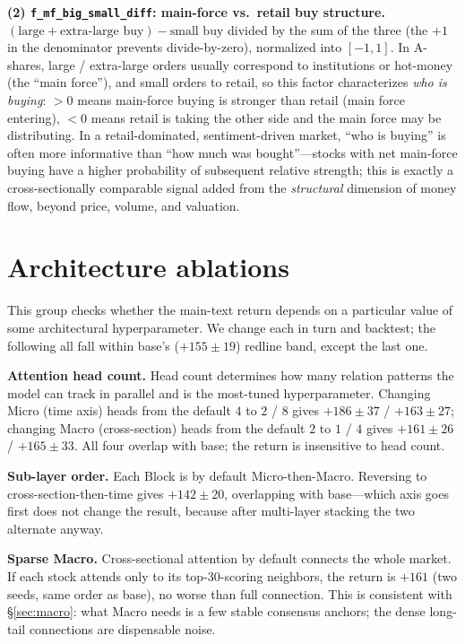 \documentclass[a4paper,11pt]{article}
\begin{document}
\textbf{(2) \texttt{f\_mf\_big\_small\_diff}: main-force vs.\ retail
buy structure.} $(\text{large}+\text{extra-large buy})-\text{small buy}$
divided by the sum of the three (the $+1$ in the denominator prevents
divide-by-zero), normalized into $[-1,1]$. In A-shares, large / extra-large
orders usually correspond to institutions or hot-money (the ``main force''),
and small orders to retail, so this factor characterizes \emph{who is buying}:
$>0$ means main-force buying is stronger than retail (main force entering),
$<0$ means retail is taking the other side and the main force may be
distributing. In a retail-dominated, sentiment-driven market, ``who is buying''
is often more informative than ``how much was bought''---stocks with net
main-force buying have a higher probability of subsequent relative strength;
this is exactly a cross-sectionally comparable signal added from the
\emph{structural} dimension of money flow, beyond price, volume, and valuation.

\section{Architecture ablations}\label{sec:abl-arch}
This group checks whether the main-text return depends on a particular value of
some architectural hyperparameter. We change each in turn and backtest; the
following all fall within base's ($+155\pm19$) redline band, except the last
one.

\textbf{Attention head count.} Head count determines how many relation
patterns the model can track in parallel and is the most-tuned hyperparameter.
Changing Micro (time axis) heads from the default $4$ to $2$ / $8$ gives
$+186\pm37$ / $+163\pm27$; changing Macro (cross-section) heads from the
default $2$ to $1$ / $4$ gives $+161\pm26$ / $+165\pm33$. All four overlap with
base; the return is insensitive to head count.

\textbf{Sub-layer order.} Each Block is by default Micro-then-Macro.
Reversing to cross-section-then-time gives $+142\pm20$, overlapping with
base---which axis goes first does not change the result, because after
multi-layer stacking the two alternate anyway.

\textbf{Sparse Macro.} Cross-sectional attention by default connects the
whole market. If each stock attends only to its top-$30$-scoring neighbors, the
return is $+161$ (two seeds, same order as base), no
worse than full connection. This is consistent with \S\ref{sec:macro}: what
Macro needs is a few stable consensus anchors; the dense long-tail connections
are dispensable noise.
\end{document}
